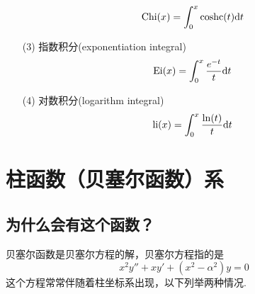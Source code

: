 \documentclass[main.tex]{subfiles}
\begin{document}
\begin{itemize}
\begin{equation*}
\begin{array}{ll}
            \displaystyle{{\rm Chi}(x) = \int_{0}^{x} {\rm coshc}(t) {\rm d}t}  \\
        \end{array}
    \end{equation*}
    \item[(3)] 指数积分(exponentiation integral)
    \[ {\rm Ei}(x) = \int_{0}^{x} \frac{e^{-t}}{t} {\rm d}t \]
    \item[(4)] 对数积分(logarithm integral)
    \[ {\rm li}(x) = \int_{0}^{x} \frac{\ln(t)}{t} {\rm d}t \]
\end{itemize}

\section{柱函数（贝塞尔函数）系}

\subsection{为什么会有这个函数？}

贝塞尔函数是贝塞尔方程的解，贝塞尔方程指的是
\[x^2y″ + xy′ + (x^2-\alpha^2)y = 0\]
这个方程常常伴随着柱坐标系出现，以下列举两种情况.
\end{document}

